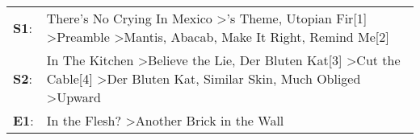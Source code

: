 \begin{supertabular}{p{0.03\textwidth}p{0.92\textwidth}}
 \textbf{S1}:  &                        There's No Crying In Mexico\textsuperscript{} \textgreater {}'s Theme\textsuperscript{}, \enspace Utopian Fir[1]\textsuperscript{} \textgreater \enspace Preamble\textsuperscript{} \textgreater \enspace Mantis\textsuperscript{}, \enspace Abacab\textsuperscript{}, \enspace Make It Right\textsuperscript{}, \enspace Remind Me[2]\textsuperscript{}  \enspace  \\
 \textbf{S2}:  &  In The Kitchen\textsuperscript{} \textgreater \enspace Believe the Lie\textsuperscript{}, \enspace Der Bluten Kat[3]\textsuperscript{} \textgreater \enspace Cut the Cable[4]\textsuperscript{} \textgreater \enspace Der Bluten Kat\textsuperscript{}, \enspace Similar Skin\textsuperscript{}, \enspace Much Obliged\textsuperscript{} \textgreater \enspace Upward\textsuperscript{}  \enspace  \\
 \textbf{E1}:  &                                                                                                                                                                                                                                                                                        In the Flesh?\textsuperscript{} \textgreater \enspace Another Brick in the Wall\textsuperscript{}  \enspace  \\
\end{supertabular}
